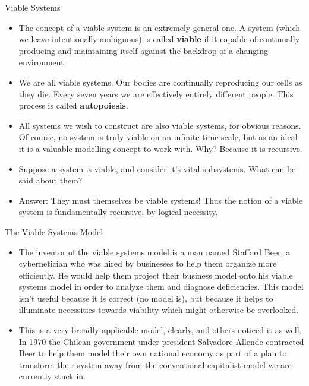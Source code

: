 \documentclass{beamer}
\begin{document}
\begin{frame}{Viable Systems}
    \begin{itemize}
        \item The concept of a viable system is an extremely general one. A system (which we leave intentionally ambiguous) is called \textbf{viable} if it capable of continually producing and maintaining itself against the backdrop of a changing environment. \pause 
        \item We are all viable systems. Our bodies are continually reproducing our cells as they die. Every seven years we are effectively entirely different people. This process is called \textbf{autopoiesis}.
        \item All systems we wish to construct are also viable systems, for obvious reasons. Of course, no system is truly viable on an infinite time scale, but as an ideal it is a valuable modelling concept to work with. Why? Because it is recursive.
        \item Suppose a system is viable, and consider it's vital subsystems. What can be said about them? \pause 
        \item Answer: They must themselves be viable systems! Thus the notion of a viable system is fundamentally recursive, by logical necessity. 
    \end{itemize}
\end{frame}

\begin{frame}{The Viable Systems Model}
    \begin{itemize}
        \item The inventor of the viable systems model is a man named Stafford Beer, a cybernetician who was hired by businesses to help them organize more efficiently. He would help them project their business model onto his viable systems model in order to analyze them and diagnose deficiencies. This model isn't useful because it is correct (no model is), but because it helps to illuminate necessities towards viability which might otherwise be overlooked. \par 
        \item This is a very broadly applicable model, clearly, and others noticed it as well. In 1970 the Chilean government under president Salvadore Allende contracted Beer to help them model their own national economy as part of a plan to transform their system away from the conventional capitalist model we are currently stuck in. \par 
    \end{itemize}
\end{frame}
\end{document}
